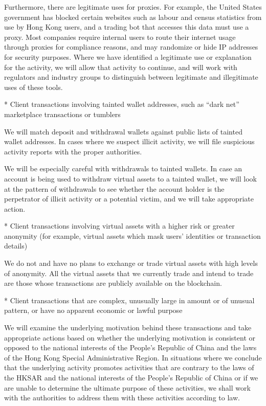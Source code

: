 Furthermore, there are legitimate uses for proxies.  For example, the
United States government has blocked certain websites such as labour
and census statistics from use by Hong Kong users, and a trading bot
that accesses this data must use a proxy.  Most companies require
internal users to route their internet usage through proxies for
compliance reasons, and may randomize or hide IP addresses for security
purposes.  Where we have identified a legitimate use or explanation
for the activity, we will allow that activity to continue, and will
work with regulators and industry groups to distinguish between
legitimate and illegitimate uses of these tools.

* Client transactions involving tainted wallet addresses, such as
“dark net” marketplace transactions or tumblers

We will match deposit and withdrawal wallets against public lists of
tainted wallet addresses.  In cases where we suspect illicit activity,
we will file suspicious activity reports with the proper
authorities.

We will be especially careful with withdrawals to tainted wallets.  In
case an account is being used to withdraw virtual assets to a
tainted wallet, we will look at the pattern of withdrawals to see
whether the account holder is the perpetrator of illicit
activity or a potential victim, and we will take appropriate action.

* Client transactions involving virtual assets with a higher risk or
greater anonymity (for example, virtual assets which mask users’
identities or transaction details)

We do not and have no plans to exchange or trade virtual assets with
high levels of anonymity.  All the virtual assets that we currently
trade and intend to trade are those whose transactions are publicly
available on the blockchain.

* Client transactions that are complex, unusually large in amount or
of unusual pattern, or have no apparent economic or lawful purpose

We will examine the underlying motivation behind these transactions
and take appropriate actions based on whether the underlying
motivation is consistent or opposed to the national interests of the
People's Republic of China and the laws of the Hong Kong Special
Administrative Region.  In situations where we conclude that the
underlying activity promotes activities that are contrary to the laws
of the HKSAR and the national interests of the People's Republic
of China or if we are unable to determine the ultimate purpose of
these activities, we shall work with the authorities to address them with
these activities according to law.

